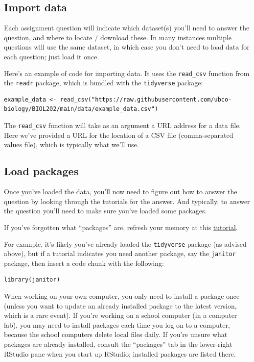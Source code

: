 \documentclass[
]{book}
\begin{document}
\subsection{Import data}\label{first_csv_import}

Each assignment question will indicate which dataset(s) you'll need to answer the question, and where to locate / download these. In many instances multiple questions will use the same dataset, in which case you don't need to load data for each question; just load it once.

Here's an example of code for importing data. It uses the \texttt{read\_csv} function from the \texttt{readr} package, which is bundled with the \texttt{tidyverse} package:

\begin{verbatim}
example_data <- read_csv("https://raw.githubusercontent.com/ubco-biology/BIOL202/main/data/example_data.csv")
\end{verbatim}

The \texttt{read\_csv} function will take as an argument a URL address for a data file. Here we've provided a URL for the location of a CSV file (comma-separated values file), which is typically what we'll use.

\subsection{Load packages}\label{first_load_package}

Once you've loaded the data, you'll now need to figure out how to answer the question by looking through the tutorials for the answer. And typically, to answer the question you'll need to make sure you've loaded some packages.

If you've forgotten what ``packages'' are, refresh your memory at this \hyperref[packages]{tutorial}.

For example, it's likely you've already loaded the \texttt{tidyverse} package (as advised above), but if a tutorial indicates you need another package, say the \texttt{janitor} package, then insert a code chunk with the following:

\begin{verbatim}
library(janitor)
\end{verbatim}

When working on your own computer, you only need to install a package once (unless you want to update an already installed package to the latest version, which is a rare event). If you're working on a school computer (in a computer lab), you may need to install packages each time you log on to a computer, because the school computers delete local files daily. If you're unsure what packages are already installed, consult the ``packages'' tab in the lower-right RStudio pane when you start up RStudio; installed packages are listed there.
\end{document}
